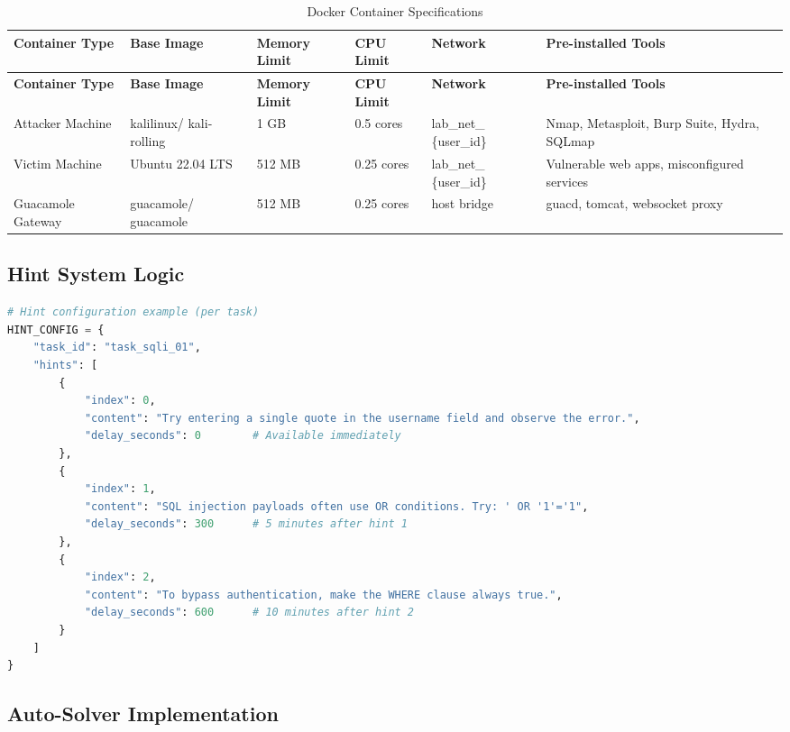 \documentclass[12pt,a4paper]{report}
\newcommand{\hrow}{}
\newcommand{\hcell}[1]{\textbf{#1}}
\newcommand{\altrow}{}
\begin{document}
\small
\begin{longtable}{|L{2.2cm}|L{2.05cm}|L{1.65cm}|L{1.45cm}|L{2.25cm}|L{3.5cm}|}
\caption{Docker Container Specifications}\label{tab:docker}\\
\hline
\hrow \hcell{Container Type} & \hcell{Base Image} & \hcell{Memory Limit} & \hcell{CPU Limit} & \hcell{Network} & \hcell{Pre-installed Tools} \\
\hline
\endfirsthead
\hline
\hrow \hcell{Container Type} & \hcell{Base Image} & \hcell{Memory Limit} & \hcell{CPU Limit} & \hcell{Network} & \hcell{Pre-installed Tools} \\
\hline
\endhead
Attacker Machine & kalilinux/ kali-rolling & 1 GB & 0.5 cores & lab\_net\_ \{user\_id\} & Nmap, Metasploit, Burp Suite, Hydra, SQLmap \\\hline
\altrow Victim Machine & Ubuntu 22.04 LTS & 512 MB & 0.25 cores & lab\_net\_ \{user\_id\} & Vulnerable web apps, misconfigured services \\\hline
Guacamole Gateway & guacamole/ guacamole & 512 MB & 0.25 cores & host bridge & guacd, tomcat, websocket proxy \\\hline
\end{longtable}
\normalsize

\subsection{Hint System Logic}

\begin{lstlisting}[language=Python, caption={Hint Configuration Example}]
# Hint configuration example (per task)
HINT_CONFIG = {
    "task_id": "task_sqli_01",
    "hints": [
        {
            "index": 0,
            "content": "Try entering a single quote in the username field and observe the error.",
            "delay_seconds": 0        # Available immediately
        },
        {
            "index": 1,
            "content": "SQL injection payloads often use OR conditions. Try: ' OR '1'='1",
            "delay_seconds": 300      # 5 minutes after hint 1
        },
        {
            "index": 2,
            "content": "To bypass authentication, make the WHERE clause always true.",
            "delay_seconds": 600      # 10 minutes after hint 2
        }
    ]
}
\end{lstlisting}

\subsection{Auto-Solver Implementation}
\end{document}
